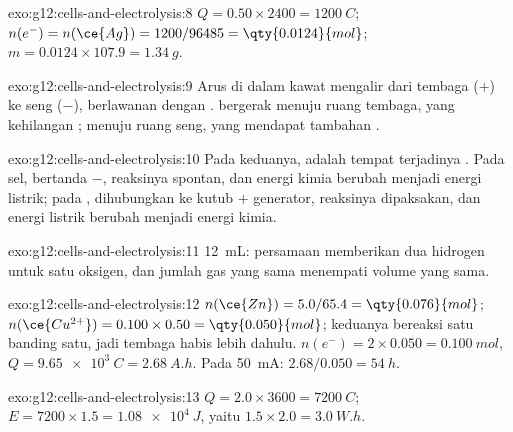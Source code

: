 \begin{solution}{exo:g12:cells-and-electrolysis:8}
$Q = 0.50 \times 2400 = \qty{1200}{C}$; $n(e^-) = n(\ce{Ag}) =
1200/96485 = \qty{0.0124}{mol}$; $m = 0.0124 \times 107.9 =
\qty{1.34}{g}$.
\end{solution}

\begin{solution}{exo:g12:cells-and-electrolysis:9}
Arus di dalam kawat mengalir dari tembaga ($+$) ke seng ($-$),
berlawanan dengan .   bergerak menuju ruang tembaga,
yang kehilangan ;   menuju ruang seng, yang
mendapat tambahan .
\end{solution}

\begin{solution}{exo:g12:cells-and-electrolysis:10}
Pada keduanya,  adalah tempat terjadinya . Pada sel, 
bertanda $-$, reaksinya spontan, dan energi kimia berubah menjadi energi
listrik; pada ,  dihubungkan ke kutub $+$ generator,
reaksinya dipaksakan, dan energi listrik berubah menjadi energi kimia.
\end{solution}

\begin{solution}{exo:g12:cells-and-electrolysis:11}
\qty{12}{mL}: persamaan  memberikan dua 
hidrogen untuk satu  oksigen, dan jumlah gas yang sama menempati
volume yang sama.
\end{solution}

\begin{solution}{exo:g12:cells-and-electrolysis:12}
$n(\ce{Zn}) = 5.0/65.4 = \qty{0.076}{mol}$;
$n(\ce{Cu^{2+}}) = 0.100 \times 0.50 = \qty{0.050}{mol}$; keduanya
bereaksi satu banding satu, jadi  tembaga habis lebih dahulu.
$n(e^-) = 2 \times 0.050
= \qty{0.100}{mol}$, $Q = \qty{9.65e3}{C} = \qty{2.68}{A.h}$. Pada
\qty{50}{mA}: $2.68/0.050 = \qty{54}{h}$.
\end{solution}

\begin{solution}{exo:g12:cells-and-electrolysis:13}
$Q = 2.0 \times 3600 = \qty{7200}{C}$; $E = 7200 \times 1.5 =
\qty{1.08e4}{J}$, yaitu $1.5 \times 2.0 = \qty{3.0}{W.h}$.
\end{solution}

